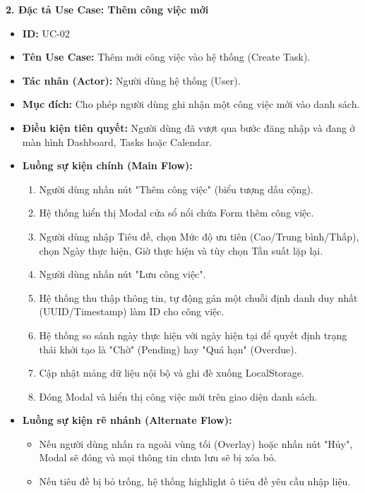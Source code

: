 \textbf{2. Đặc tả Use Case: Thêm công việc mới}
\begin{itemize}
    \item \textbf{ID:} UC-02
    \item \textbf{Tên Use Case:} Thêm mới công việc vào hệ thống (Create Task).
    \item \textbf{Tác nhân (Actor):} Người dùng hệ thống (User).
    \item \textbf{Mục đích:} Cho phép người dùng ghi nhận một công việc mới vào danh sách.
    \item \textbf{Điều kiện tiên quyết:} Người dùng đã vượt qua bước đăng nhập và đang ở màn hình Dashboard, Tasks hoặc Calendar.
    \item \textbf{Luồng sự kiện chính (Main Flow):}
    \begin{enumerate}
        \item Người dùng nhấn nút "Thêm công việc" (biểu tượng dấu cộng).
        \item Hệ thống hiển thị Modal cửa sổ nổi chứa Form thêm công việc.
        \item Người dùng nhập Tiêu đề, chọn Mức độ ưu tiên (Cao/Trung bình/Thấp), chọn Ngày thực hiện, Giờ thực hiện và tùy chọn Tần suất lặp lại.
        \item Người dùng nhấn nút "Lưu công việc".
        \item Hệ thống thu thập thông tin, tự động gán một chuỗi định danh duy nhất (UUID/Timestamp) làm ID cho công việc.
        \item Hệ thống so sánh ngày thực hiện với ngày hiện tại để quyết định trạng thái khởi tạo là "Chờ" (Pending) hay "Quá hạn" (Overdue).
        \item Cập nhật mảng dữ liệu nội bộ và ghi đè xuống LocalStorage.
        \item Đóng Modal và hiển thị công việc mới trên giao diện danh sách.
    \end{enumerate}
    \item \textbf{Luồng sự kiện rẽ nhánh (Alternate Flow):} 
    \begin{itemize}
        \item Nếu người dùng nhấn ra ngoài vùng tối (Overlay) hoặc nhấn nút "Hủy", Modal sẽ đóng và mọi thông tin chưa lưu sẽ bị xóa bỏ.
        \item Nếu tiêu đề bị bỏ trống, hệ thống highlight ô tiêu đề yêu cầu nhập liệu.
    \end{itemize}
\end{itemize}

